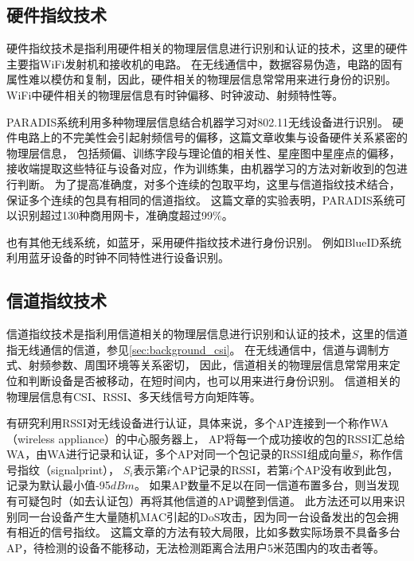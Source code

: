 		\subsection{硬件指纹技术}\label{subsec:phy_tech_device_fingerprint}
		硬件指纹技术是指利用硬件相关的物理层信息进行识别和认证的技术，这里的硬件主要指WiFi发射机和接收机的电路。
		在无线通信中，数据容易伪造，电路的固有属性难以模仿和复制，因此，硬件相关的物理层信息常常用来进行身份的识别。
		WiFi中硬件相关的物理层信息有时钟偏移、时钟波动、射频特性等。

		PARADIS系统\cite{mobicom08radiometric}利用多种物理层信息结合机器学习对802.11无线设备进行识别。
		硬件电路上的不完美性会引起射频信号的偏移，这篇文章收集与设备硬件关系紧密的物理层信息，
		包括频偏、训练字段与理论值的相关性、星座图中星座点的偏移，接收端提取这些特征与设备对应，作为训练集，由机器学习的方法对新收到的包进行判断。
		为了提高准确度，对多个连续的包取平均，这里与信道指纹技术结合，保证多个连续的包具有相同的信道指纹。
		这篇文章的实验表明，PARADIS系统可以识别超过130种商用网卡，准确度超过99\%。

		也有其他无线系统，如蓝牙，采用硬件指纹技术进行身份识别。
		例如BlueID系统\cite{infocom14blueid}利用蓝牙设备的时钟不同特性进行设备识别。

		\subsection{信道指纹技术}\label{subsec:phy_tech_channel_fingerprint}
		信道指纹技术是指利用信道相关的物理层信息进行识别和认证的技术，这里的信道指无线通信的信道，参见\ref{sec:background_csi}。
		在无线通信中，信道与调制方式、射频参数、周围环境等关系密切，
		因此，信道相关的物理层信息常常用来定位和判断设备是否被移动，在短时间内，也可以用来进行身份识别。
		信道相关的物理层信息有CSI、RSSI、多天线信号方向矩阵等。

		有研究利用RSSI对无线设备进行认证\cite{wisec06spoofing}，具体来说，多个AP连接到一个称作WA（wireless appliance）的中心服务器上，
		AP将每一个成功接收的包的RSSI汇总给WA，由WA进行记录和认证，多个AP对同一个包记录的RSSI组成向量$S$，称作信号指纹（signalprint），
		$S_i$表示第$i$个AP记录的RSSI，若第$i$个AP没有收到此包，记录为默认最小值-95$dBm$。
		如果AP数量不足以在同一信道布置多台，则当发现有可疑包时（如去认证包）再将其他信道的AP调整到信道。
		此方法还可以用来识别同一台设备产生大量随机MAC引起的DoS攻击，因为同一台设备发出的包会拥有相近的信号指纹。
		这篇文章的方法有较大局限，比如多数实际场景不具备多台AP，待检测的设备不能移动，无法检测距离合法用户5米范围内的攻击者等。

